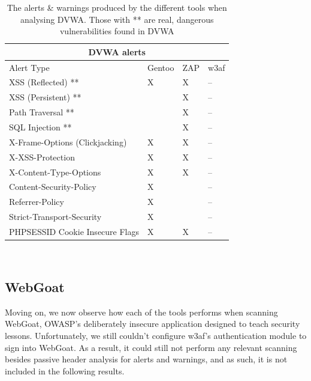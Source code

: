 \begin{table}[h]
	
	{
		
		\captionsetup{justification=centering}
		
		\caption{The alerts \& warnings produced by the different tools when analysing DVWA. Those with ** are real, dangerous vulnerabilities found in DVWA}
		\label{table:dvwa_alerts}
		\begin{tabular}{ |p{7cm}|>{\centering\arraybackslash}m{2cm} |>{\centering\arraybackslash}m{2cm} |>{\centering\arraybackslash}m{2cm}| }
			\hline
			\multicolumn{4}{|c|}{\textbf{DVWA alerts}} \\ [0.5ex]
			\hline \hline 
			Alert Type & Gentoo & ZAP & w3af \\
			\hline
			XSS (Reflected) ** & X & X & --\\
			XSS (Persistent) ** &  & X & --\\
			Path Traversal ** &  & X & --\\
			SQL Injection **& & X & --\\
			X-Frame-Options (Clickjacking) & X & X & -- \\
			X-XSS-Protection & X & X & --\\
			X-Content-Type-Options& X & X &-- \\
			Content-Security-Policy & X & &-- \\
			Referrer-Policy & X & & --\\
			Strict-Transport-Security & X  & & --\\
			PHPSESSID Cookie Insecure Flags & X & X & -- \\
			\hline
		\end{tabular}
	} \\
\end{table}



\subsection{WebGoat}

Moving on, we now observe how each of the tools performs when scanning WebGoat, OWASP's deliberately insecure application designed to teach security lessons. Unfortunately, we still couldn't configure w3af's authentication module to sign into WebGoat. As a result, it could still not perform any relevant scanning besides passive header analysis for alerts and warnings, and as such, it is not included in the following results. \\

